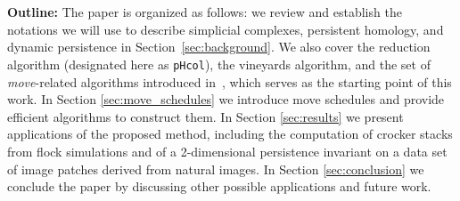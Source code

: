 \documentclass[sn-mathphys]{sn-jnl}
\newtheorem{proposition}{Proposition}
\newtheorem{corollary}{Corollary}
\begin{document}
\\
\\
\noindent 
\textbf{Outline:} The paper is organized as follows: we review and establish the notations we will use to describe simplicial complexes, persistent homology, and dynamic persistence in Section~\ref{sec:background}. 
We also cover the reduction algorithm (designated here as \texttt{pHcol}), the vineyards algorithm, and the set of \emph{move}-related algorithms introduced in~\cite{busaryev2010tracking}, which serves as the starting point of this work. 
In Section \ref{sec:move_schedules} we introduce move schedules and provide efficient algorithms to construct them. 
In Section \ref{sec:results} we present applications of the proposed method, including the computation of crocker stacks from flock simulations and of a 2-dimensional persistence invariant on a data set of image patches derived from natural images. 
In Section \ref{sec:conclusion} we conclude the paper by discussing other possible applications and future work. 
 
\end{document}

